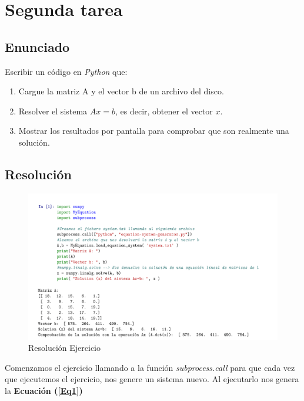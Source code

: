 \documentclass[12pt,twoside]{article}
\begin{document}
\section{Segunda tarea}

\subsection{Enunciado}

Escribir un código en \textit{Python} que:

\begin{enumerate}

\item Cargue la matriz A y el vector b de un archivo del disco.

\item Resolver el sistema $Ax=b$, es decir, obtener el vector $x$.

\item Mostrar los resultados por pantalla para comprobar que son realmente una solución.

\end{enumerate}

\subsection{Resolución}

\begin{figure}[hbt]
\begin{center}
	\includegraphics[width=1\textwidth]{task2.png}
	\caption{Resolución Ejercicio}
	\label{fig:fig7}
\end{center}
\end{figure}

Comenzamos el ejercicio llamando a la función \textit{subprocess.call} para que cada vez que ejecutemos el ejercicio, nos genere un sistema nuevo.
Al ejecutarlo nos genera la \textbf{Ecuación (\ref{Eq1})}
\end{document}
